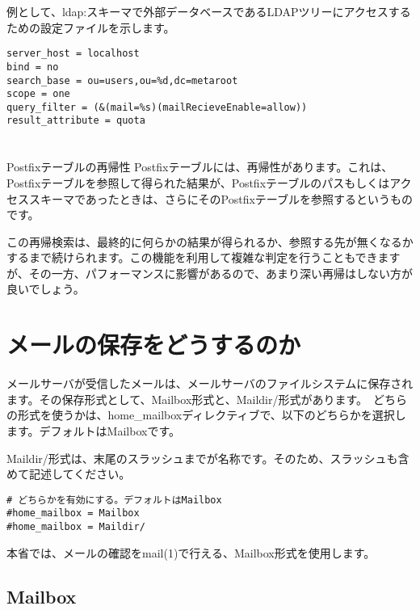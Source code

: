 例として、ldap:スキーマで外部データベースであるLDAPツリーにアクセスするための設定ファイルを示します。

\begin{lstlisting}[basicstyle=\ttfamily\footnotesize, frame=single]
server_host = localhost
bind = no
search_base = ou=users,ou=%d,dc=metaroot
scope = one
query_filter = (&(mail=%s)(mailRecieveEnable=allow))
result_attribute = quota
\end{lstlisting}


\section*{}
\begin{itembox}[l]{Postfixテーブルの再帰性}
Postfixテーブルには、再帰性があります。これは、Postfixテーブルを参照して得られた結果が、Postfixテーブルのパスもしくはアクセススキーマであったときは、さらにそのPostfixテーブルを参照するというものです。

この再帰検索は、最終的に何らかの結果が得られるか、参照する先が無くなるかするまで続けられます。この機能を利用して複雑な判定を行うこともできますが、その一方、パフォーマンスに影響があるので、あまり深い再帰はしない方が良いでしょう。

\end{itembox}



\section{メールの保存をどうするのか}
メールサーバが受信したメールは、メールサーバのファイルシステムに保存されます。その保存形式として、Mailbox形式と、Maildir/形式があります。　どちらの形式を使うかは、home\_mailboxディレクティブで、以下のどちらかを選択します。デフォルトはMailboxです。

Maildir/形式は、末尾のスラッシュまでが名称です。そのため、スラッシュも含めて記述してください。

\begin{lstlisting}[basicstyle=\ttfamily\footnotesize, frame=single]
# どちらかを有効にする。デフォルトはMailbox
#home_mailbox = Mailbox
#home_mailbox = Maildir/
\end{lstlisting}

本省では、メールの確認をmail(1)で行える、Mailbox形式を使用します。

\subsection{Mailbox}

